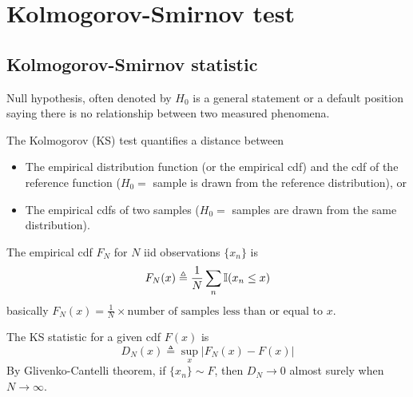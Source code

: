 \section{Kolmogorov-Smirnov test}
\subsection{Kolmogorov-Smirnov statistic}
Null hypothesis, often denoted by $H_0$ is a general statement or a default position saying there is no relationship between two measured phenomena. 

The Kolmogorov (KS) test quantifies a distance between
\begin{itemize}
	\item The empirical distribution function (or the empirical cdf) and the cdf of the reference function ($H_0 = $ sample is drawn from the reference distribution), or
	\item The empirical cdfs of two samples ($H_0 = $ samples are drawn from the same distribution).
\end{itemize}

The empirical cdf $F_N$ for $N$ iid observations $\{x_n\}$ is
\begin{equation}
	F_N(x) \triangleq \frac{1}{N} \sum_n \operatorname{\mathbb I}(x_n \leq x)
\end{equation}
basically $F_N(x) = \frac{1}{N} \times \text{number of samples less than or equal to } x$.

The KS statistic for a given cdf $F(x)$ is
\begin{equation}
	D_N(x) \triangleq \sup_x \left|F_N(x) - F(x)\right|
\end{equation}
By Glivenko-Cantelli theorem, if $\{x_n\} \sim F$, then $D_N \to 0$ almost surely when $N \to \infty$.